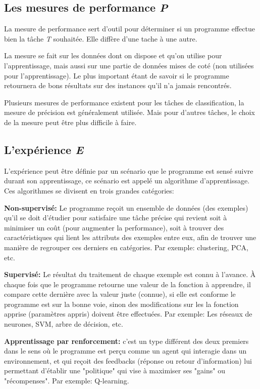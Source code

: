 \subsection{Les mesures de performance \textit{P}}

	La mesure de performance sert d'outil pour déterminer si un programme effectue bien la tâche \textit{T} souhaitée. Elle diffère d'une tache à une autre.
	
	La mesure se fait sur les données dont on dispose et qu'on utilise pour l'apprentissage, mais aussi sur une partie de données mises de coté (non utilisées pour l'apprentissage). Le plus important étant de savoir si le programme retournera de bons résultats sur des instances qu'il n'a jamais rencontrés.   

	Plusieurs mesures de performance existent pour les tâches de classification, la mesure de précision est généralement utilisée. Mais pour d'autres tâches, le choix de la mesure peut être plus difficile à faire.

\subsection{L’expérience \textit{E}}

	L'expérience peut être définie par un scénario que le programme est sensé suivre durant son apprentissage, ce scénario est appelé un algorithme d'apprentissage. Ces algorithmes se divisent en trois grandes catégories:
	
\textbf{Non-supervisé:} Le programme reçoit un ensemble de données (des exemples) qu'il se doit d'étudier pour satisfaire une tâche précise qui revient soit à minimiser un coût (pour augmenter la performance), soit à trouver des caractéristiques qui lient les attributs des exemples entre eux, afin de trouver une manière de regrouper ces derniers en catégories. Par exemple: clustering, PCA, etc.

\textbf{Supervisé:} Le résultat du traitement de chaque exemple est connu à l'avance. À chaque fois que le programme retourne une valeur de la fonction à apprendre, il compare cette dernière avec la valeur juste (connue), si elle est conforme le programme est sur la bonne voie, sinon des modifications sur les la fonction apprise (paramètres appris) doivent être effectuées. Par exemple: Les réseaux de neurones, SVM, arbre de décision, etc.

\textbf{Apprentissage par renforcement:} c'est un type différent des deux premiers dans le sens où le programme est perçu comme un agent qui interagie dans un environnement, et qui reçoit des feedbacks (réponse ou retour d'information) lui permettant d’établir une "politique" qui vise à maximiser ses "gains" ou "récompenses". Par exemple: Q-learning.


